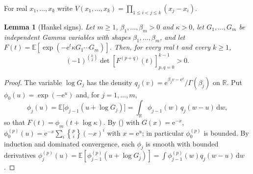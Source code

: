 \documentclass[twoside,10pt]{article}
\numberwithin{equation}{section}
\theoremstyle{slbody}
\newtheorem{lemma}[theorem]{Lemma}
\theoremstyle{remark}
\newcommand{\dd}{\,\mathrm d}
\newcommand{\e}{\mathrm e}
\newcommand{\stir}[2]{\genfrac\{\}{0pt}{}{#1}{#2}}
\newcommand{\E}{\mathbb E}
\renewcommand{\eqref}[1]{%
  \textup{{\normalfont(\oldstylenums{\ref{#1}}}\normalfont)}}
\begin{document}
For real \(x_1,\ldots,x_k\) write
\(V(x_1,\ldots,x_k)=\prod_{1\leq i<j\leq k}(x_j-x_i)\).

\begin{lemma}[Hankel signs]\label{lem:hankel-signs}
Let \(m\geq1\), \(\beta_1,\ldots,\beta_m>0\) and \(\kappa>0\), let
\(G_1,\ldots,G_m\) be independent Gamma variables with shapes
\(\beta_1,\ldots,\beta_m\), and let
\(F(t)=\E[\exp(-\e^t\kappa G_1\cdots G_m)]\).  Then, for every real
\(t\) and every \(k\geq1\),
\[
(-1)^{\binom k2}\det\left[F^{(p+q)}(t)\right]_{p,q=0}^{k-1}>0.
\]
\end{lemma}

\begin{proof}
The variable \(\log G_j\) has the density
\(q_j(v)=\e^{\beta_jv-\e^v}/\Gamma(\beta_j)\) on \(\mathbb R\).  Put
\(\phi_0(u)=\exp(-\e^u)\) and, for \(j=1,\ldots,m\),
\[
\phi_j(u)=\E\bigl[\phi_{j-1}(u+\log G_j)\bigr]
=\int_{\mathbb R}\phi_{j-1}(w)\,q_j(w-u)\dd w,
\]
so that \(F(t)=\phi_m(t+\log\kappa)\).  By \eqref{eq:stirling} with
\(G(x)=\e^{-x}\),
\(\phi_0^{(p)}(u)=\e^{-x}\sum_i\stir pi(-x)^i\) with \(x=\e^u\); in
particular \(\phi_0^{(p)}\) is bounded.  By induction and dominated
convergence, each \(\phi_j\) is smooth with bounded derivatives
\(\phi_j^{(p)}(u)=\E[\phi_{j-1}^{(p)}(u+\log G_j)]
=\int\phi_{j-1}^{(p)}(w)q_j(w-u)\dd w\).


\end{proof}
\end{document}
